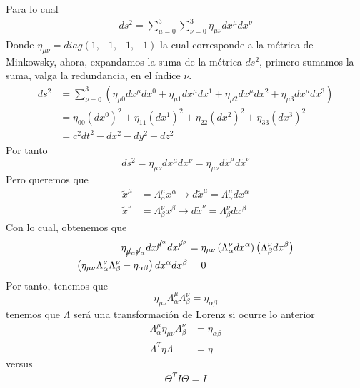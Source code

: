 \documentclass[../main.tex]{subfiles}
\begin{document}
Para lo cual
\begin{align*}
  ds^2 = \sum_{\mu=0}^3\sum_{\nu=0}^3\eta_{\mu \nu}dx^\mu dx^\nu
\end{align*}
Donde $\eta_{\mu \nu} = diag(1,-1,-1,-1)$ la cual corresponde a la métrica de Minkowsky, ahora, expandamos la suma de la métrica $ds^2$, primero sumamos la suma, valga la redundancia, en el índice $\nu$.
\begin{align*}
  ds^2  & = \sum_{\nu=0}^3 \left( \eta_{\mu 0}dx^\mu dx^0 + \eta_{\mu 1}dx^\mu dx^1 + \eta_{\mu 2}dx^\mu dx^2 + \eta_{\mu 3}dx^\mu dx^3 \right) \\
  & = \eta_{00}(dx^0)^2 + \eta_{11}(dx^1)^2 + \eta_{22}(dx^2)^2 + \eta_{33}(dx^3)^2 \\
  & = c^2dt^2-dx^2-dy^2-dz^2
\end{align*}
Por tanto
\begin{equation*}
  ds^2 = \eta_{\mu \nu }dx^\mu dx^\nu = \eta_{\mu \nu } d\tilde{x}^\mu d\tilde{x}^\nu 
\end{equation*}
Pero queremos que
\begin{align*}
  \tilde{x}^\mu & = \Lambda_\alpha^\mu x^\alpha \rightarrow d\tilde{x}^\mu = \Lambda^\mu_\alpha dx^\alpha \\
  \tilde{x}^\nu & = \Lambda_\beta^\nu x^\beta \rightarrow d\tilde {x}^\nu   = \Lambda_\beta^\nu dx^\beta 
\end{align*}
Con lo cual, obtenemos que
\begin{align*}
  \eta_{\cancel{\mu}_\alpha \cancel{\nu}_\alpha} dx^{\cancel{\mu}^\alpha} dx^{\cancel{\nu}^\beta}  & = \eta_{\mu \nu } \left( \Lambda_\alpha^\nu dx^\alpha \right)\left( \Lambda_\beta^\nu dx^\beta \right) \\
  \left(\eta_{\mu \nu}\Lambda_\alpha^\nu \Lambda_\beta^\nu-\eta_{\alpha \beta}\right)dx^\alpha dx^\beta & = 0
\end{align*}
Por tanto, tenemos que
\begin{equation}
  \eta_{\mu \nu} \Lambda^\mu_\alpha \Lambda_\beta^\nu = \eta_{\alpha \beta}
\end{equation}
tenemos que $\Lambda$ será una transformación de Lorenz si ocurre lo anterior
\begin{align*}
 \Lambda_\alpha^\mu \eta_{\mu \nu} \Lambda_\beta^\nu & = \eta_{\alpha \beta} \\
  \Lambda^T \eta \Lambda & = \eta 
\end{align*}
versus 
\begin{align*}
  \Theta^T I \Theta = I
\end{align*}
\end{document}

